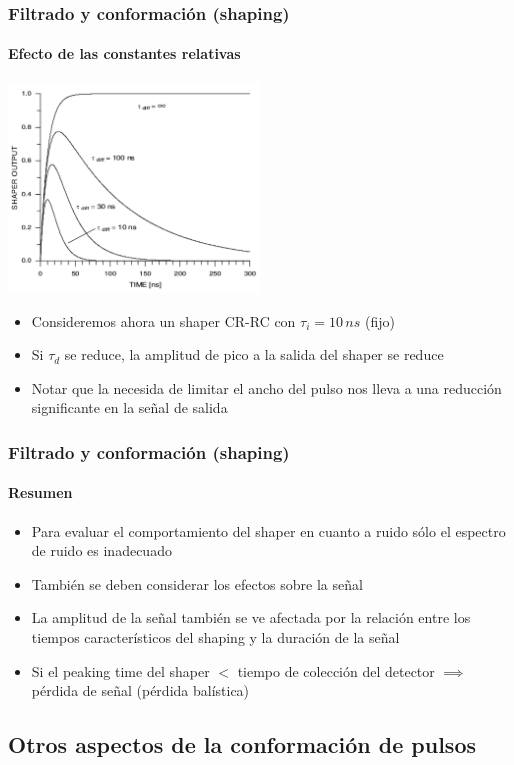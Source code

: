 \documentclass{beamer}
\begin{document}
\begin{frame}
\frametitle{Filtrado y conformación (shaping)}
\framesubtitle{{\color{blue}Efecto de las constantes relativas}}
\begin{center}
\includegraphics[width=0.5\textwidth]{d2/efecto_tc_shaper2}
\end{center}
\begin{itemize}
\item Consideremos ahora un shaper CR-RC con $\tau_i = 10\,ns$ (fijo)
\item Si $\tau_d$ se reduce, la amplitud de pico a la salida del
shaper se reduce
\item Notar que la necesida de limitar el ancho del pulso nos lleva a una
reducción significante en la señal de salida 
\end{itemize}
\end{frame}

\begin{frame}
\frametitle{Filtrado y conformación (shaping)}
\framesubtitle{{\color{blue}Resumen}}
\begin{itemize}
\item Para evaluar el comportamiento del shaper en cuanto a ruido sólo el
espectro de ruido es inadecuado
\item También se deben considerar los efectos sobre la señal
\item La amplitud de la señal también se ve afectada por la relación entre los
tiempos característicos del shaping y la duración de la señal  
\item Si el peaking time del shaper $<$ tiempo de colección del detector
$\implies$ pérdida de señal (pérdida balística)
\end{itemize}
\end{frame}

\subsection{Otros aspectos de la conformación de pulsos}
\end{document}
